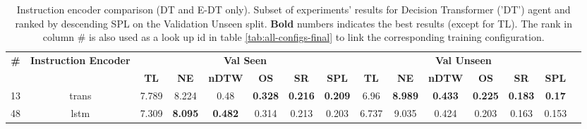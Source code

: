 \begin{table}
\centering
\caption{\label{tab:dt_instruction_encoding}Instruction encoder comparison (DT and E-DT only). Subset of experiments' results for Decision Transformer ('DT') agent and ranked by descending SPL on the Validation Unseen split. \textbf{Bold} numbers indicates the best results (except for TL). The rank in column \# is also used as a look up id in table \ref{tab:all-configs-final} to link the corresponding training configuration.}
\begin{tabular}{@{\hskip3pt}c@{\hskip3pt}c@{\hskip3pt}c@{\hskip3pt}c@{\hskip3pt}c@{\hskip3pt}c@{\hskip3pt}c@{\hskip3pt}c@{\hskip3pt}c@{\hskip3pt}c@{\hskip3pt}c@{\hskip3pt}c@{\hskip3pt}c@{\hskip3pt}c@{\hskip3pt}c}
\toprule
                                  \textbf{\#} & \textbf{Instruction Encoder} & \multicolumn{6}{c}{\textbf{Val Seen}} & \multicolumn{6}{c}{\textbf{Val Unseen}} \\
\cmidrule(l){3-8}\cmidrule(l){9-14}\textbf{~} &                   \textbf{~} &       \textbf{TL} &     \textbf{NE} &   \textbf{nDTW} &     \textbf{OS} &     \textbf{SR} &    \textbf{SPL} &         \textbf{TL} &     \textbf{NE} &   \textbf{nDTW} &     \textbf{OS} &     \textbf{SR} &   \textbf{SPL} \\
\midrule
                                           13 &                        trans &             7.789 &           8.224 &            0.48 &  \textbf{0.328} &  \textbf{0.216} &  \textbf{0.209} &                6.96 &  \textbf{8.989} &  \textbf{0.433} &  \textbf{0.225} &  \textbf{0.183} &  \textbf{0.17} \\
                                           48 &                         lstm &             7.309 &  \textbf{8.095} &  \textbf{0.482} &           0.314 &           0.213 &           0.203 &               6.737 &           9.035 &           0.424 &           0.203 &           0.163 &          0.153 \\
\bottomrule
\end{tabular}
\end{table}
